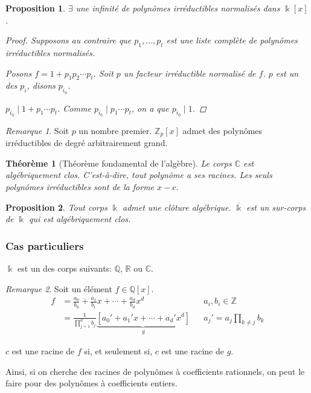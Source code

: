 \documentclass{report}
\newtheorem*{thm}{Th\'eor\`eme}
\newtheorem*{prop}{Proposition}
\theoremstyle{definition}
\theoremstyle{remark}
\newtheorem*{rmq}{Remarque}
\def\ZZ{\mathbb{Z}}
\def\QQ{\mathbb{Q}}
\def\RR{\mathbb{R}}
\def\CC{\mathbb{C}}
\begin{document}
	\begin{prop}
		$\exists$ une infinit\'e de polyn\^omes irr\'eductibles normalis\'es dans $\Bbbk[x]$.
		\begin{proof}
			Supposons au contraire que $p_1,\dots,p_t$ est une liste compl\`ete de polyn\^omes irr\'eductibles normalis\'es.

			Posons $f=1+p_1p_2\cdots p_t$. Soit $p$ un facteur irr\'eductible normalis\'e de $f$. $p$ est un des $p_i$, disons $p_{i_0}$.

			$p_{i_0}\mid 1+p_1\cdots p_t$. Comme $p_{i_0}\mid p_1\cdots p_t$, on a que $p_{i_0}\mid 1$. \lightning
		\end{proof}
	\end{prop}

	\begin{rmq}
		Soit $p$ un nombre premier. $\ZZ_p[x]$ admet des polyn\^omes irr\'eductibles de degr\'e arbitrairement grand.
	\end{rmq}

	\begin{thm}[Th\'eor\`eme fondamental de l'alg\`ebre]
		Le corps $\CC$ est \emph{alg\'ebriquement clos}. C'est-\`a-dire, tout polyn\^ome a ses racines. Les seuls polyn\^omes irr\'eductibles sont de la forme $x-c$.
	\end{thm}

	\begin{prop}
		Tout corps $\Bbbk$ admet une \emph{cl\^oture alg\'ebrique}. $\overline{\Bbbk}$ est un sur-corps de $\Bbbk$ qui est alg\'ebriquement clos.
	\end{prop}

	\subsubsection{Cas particuliers}
	$\Bbbk$ est un des corps suivants: $\QQ$, $\RR$ ou $\CC$.
	\begin{rmq}
		Soit un \'el\'ement $f\in\QQ[x]$.
		\begin{align*}
			f&= \frac{a_0}{b_0} + \frac{a_1}{b_1}x + \cdots + \frac{a_d}{b_d}x^d&&a_i,b_i\in\ZZ\\
			&= \frac{1}{\prod_{j=1}^{d}b_j}\underbrace{\left[ a_0'+a_1'x+\cdots+a_d'x^d \right]}_{g}&&a_j'=a_j\prod_{k\neq j}b_k
		\end{align*}

		$c$ est une racine de $f$ si, et seulement si, $c$ est une racine de $g$.

		Ainsi, si on cherche des racines de polyn\^omes \`a coefficients rationnels, on peut le faire pour des polyn\^omes \`a coefficients entiers.
	\end{rmq}
\end{document}
